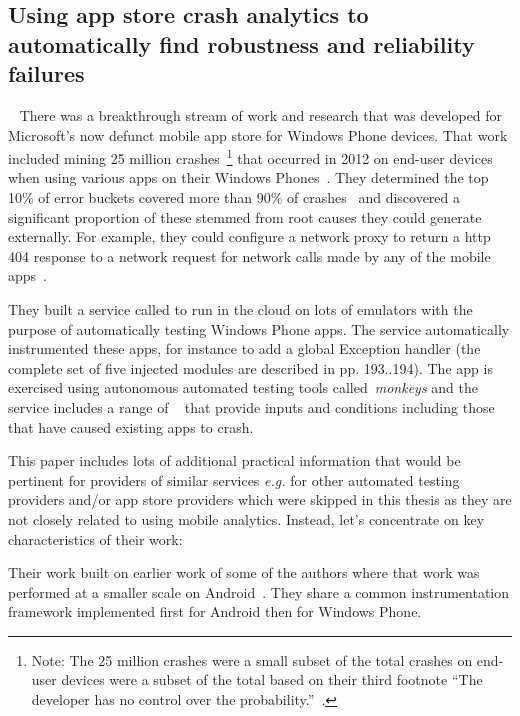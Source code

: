 \subsection{Using app store crash analytics to automatically find robustness and reliability failures}~\label{rw-windows-phone-store-crash-analysis-section}
There was a breakthrough stream of work and research that was developed for Microsoft's now defunct mobile app store for Windows Phone devices. That work included mining 25 million crashes~\footnote{Note: The 25 million crashes were a small subset of the total crashes on end-user devices were a subset of the total based on their third footnote ``The developer has no control over the probability.''~\cite[p. 191]{ravindrath2014_automatic_and_scalable_fault_detection_for_mobile_apps}.} that occurred in 2012 on end-user devices when using various apps on their Windows Phones~. They determined the top 10\% of error buckets covered more than 90\% of crashes~ and discovered a significant proportion of these stemmed from root causes they could generate externally. For example, they could configure a network proxy to return a \Gls{http} 404 response to a network request for network calls made by any of the mobile apps~.

They built a service called  to run in the cloud on lots of  emulators with the purpose of automatically testing Windows Phone apps. The service automatically instrumented these apps, for instance to add a global Exception handler (the complete set of five injected modules are described in pp. 193..194). The app is exercised using autonomous automated testing tools called~\emph{monkeys} and the service includes a range of ~ that provide inputs and conditions including those that have caused existing apps to crash. 

This paper includes lots of additional practical information that would be pertinent for providers of similar services \emph{e.g.} for other automated testing providers and/or app store providers which were skipped in this thesis as they are not closely related to using mobile analytics. Instead, let's concentrate on key characteristics of their work:

Their work built on earlier work of some of the authors where that work was performed at a smaller scale on Android~. They share a common instrumentation framework implemented first for Android then for Windows Phone.

